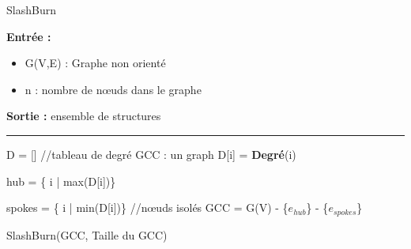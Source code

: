 \documentclass[a4paper,oneside,12pt]{report}
\theoremstyle{definition}
\begin{document}
\begin{algorithm}[H]
					\label{alg:SlashBurn}
					\caption{SlashBurn}
					\textbf{Entrée :}
						\begin{itemize}[label=$\bullet$]
							\item G(V,E) : Graphe non orienté 
							\item n : nombre de nœuds dans le graphe 
							
						\end{itemize}
					\textbf{Sortie :} ensemble de structures\\							\noindent\rule{\textwidth}{1pt}
						
						
				\begin{algorithmic} [1]
				 \STATE 
				 \STATE D = [] //tableau de degré
				 \STATE GCC : un graph				 				 
				 \STATE D[i] = \textbf{Degré}(i)
				 \ENDFOR
				 
					\STATE hub = \{ i | max(D[i])\}
					
					\STATE spokes = \{ i | min(D[i])\} //nœuds isolés 
					\STATE GCC = G(V) - \{$e_{hub}$\} - \{$e_{spokes}$\}
					
					
				
				\STATE SlashBurn(GCC, Taille du GCC)  
				\end{algorithmic}
			\end{algorithm}

\newpage

\label{KCBC}
\end{document}
